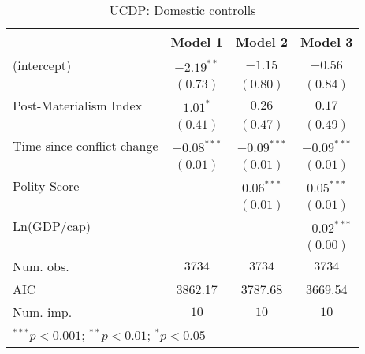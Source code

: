 
\begin{table}
\begin{center}
\begin{tabular}{l c c c}
\toprule
 & Model 1 & Model 2 & Model 3 \\
\midrule
(intercept)                & $-2.19^{**}$  & $-1.15$       & $-0.56$       \\
                           & $(0.73)$      & $(0.80)$      & $(0.84)$      \\
Post-Materialism Index     & $1.01^{*}$    & $0.26$        & $0.17$        \\
                           & $(0.41)$      & $(0.47)$      & $(0.49)$      \\
Time since conflict change & $-0.08^{***}$ & $-0.09^{***}$ & $-0.09^{***}$ \\
                           & $(0.01)$      & $(0.01)$      & $(0.01)$      \\
Polity Score               &               & $0.06^{***}$  & $0.05^{***}$  \\
                           &               & $(0.01)$      & $(0.01)$      \\
Ln(GDP/cap)                &               &               & $-0.02^{***}$ \\
                           &               &               & $(0.00)$      \\
\midrule
Num. obs.                  & $3734$        & $3734$        & $3734$        \\
AIC                        & 3862.17       & 3787.68       & 3669.54       \\
Num. imp.                  & $10$          & $10$          & $10$          \\
\bottomrule
\multicolumn{4}{l}{\scriptsize{$^{***}p<0.001$; $^{**}p<0.01$; $^{*}p<0.05$}}
\end{tabular}
\caption{UCDP: Domestic controlls}
\label{UCDP_1_PM}
\end{center}
\end{table}

